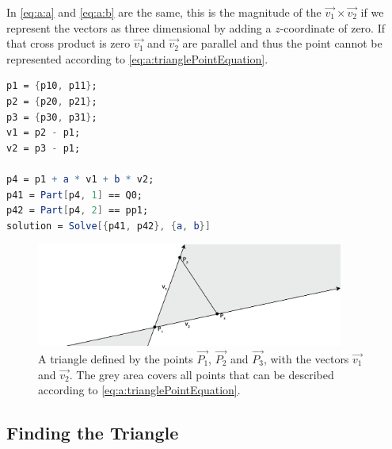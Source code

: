 In \eqref{eq:a:a} and \eqref{eq:a:b} are the same, this is the magnitude of the $\vec{v_1} \times \vec{v_2}$ if we represent the vectors as three dimensional by adding a $z$-coordinate of zero. If that cross product is zero $\vec{v_1}$ and $\vec{v_2}$ are parallel and thus the point  cannot be represented according to \eqref{eq:a:trianglePointEquation}.

	\begin{lstlisting}[float, language=Mathematica, label={lst:a:pointInTriangleMathematica}, caption={Mathematica code used to compute the to compute $a$ and $b$.}]
p1 = {p10, p11};
p2 = {p20, p21};
p3 = {p30, p31};
v1 = p2 - p1;
v2 = p3 - p1;

p4 = p1 + a * v1 + b * v2;
p41 = Part[p4, 1] == Q0;
p42 = Part[p4, 2] == pp1;
solution = Solve[{p41, p42}, {a, b}]
	\end{lstlisting}

\begin{figure}
	\centering
	\includegraphics[width=0.9\textwidth, frame]{./img/1_triangle_point-01}
	\caption{A triangle defined by the points $\vec{P_1}$, $\vec{P_2}$ and $\vec{P_3}$, with the vectors $\vec{v_1}$ and $\vec{v_2}$. The grey area covers all points that can be described according to \eqref{eq:a:trianglePointEquation}.}
	\label{fig:a:triangle_point}
\end{figure}




\subsection{Finding the Triangle}
